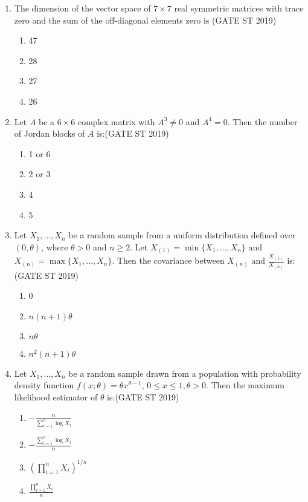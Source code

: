 \documentclass[journal]{IEEEtran}
\begin{document}
\begin{enumerate}[start=1]
\item The dimension of the vector space of \(7 \times 7\) real symmetric matrices with trace zero and the sum of the off-diagonal elements zero is \hfill(GATE ST 2019)
\begin{multicols}{4}
\begin{enumerate}
    \item 47
    \item 28
    \item 27
    \item 26
\end{enumerate}
\end{multicols}



\item Let \(A\) be a \(6 \times 6\) complex matrix with \(A^3 \neq 0\) and \(A^4 = 0\). Then the number of Jordan blocks of \(A\) is:\hfill(GATE ST 2019)
\begin{multicols}{4}
\begin{enumerate}
     \item 1 or 6
     \item 2 or 3
     \item 4
     \item 5
\end{enumerate}
\end{multicols}

\item Let \(X_1, \ldots, X_n\) be a random sample from a uniform distribution defined over \((0, \theta)\), where \(\theta > 0\) and \(n \geq 2\). Let \(X_{(1)} = \min\{X_1,\ldots,X_n\}\) and \(X_{(n)} = \max\{X_1, \ldots, X_n\}\). Then the covariance between \(X_{(n)}\) and \(\frac{X_{(1)}}{X_{(n)}}\) is:\hfill(GATE ST 2019)
\begin{multicols}{4}
\begin{enumerate}
\item 0
\item \(n(n+1) \theta\)
\item \(n \theta\)
\item \(n^2 (n+1) \theta\)
\end{enumerate}
\end{multicols}

\item Let \(X_1, \ldots, X_n\) be a random sample drawn from a population with probability density function \(f(x; \theta) = \theta x^{\theta - 1}, \, 0 \leq x \leq 1, \theta > 0\). Then the maximum likelihood estimator of \(\theta\) is:\hfill(GATE ST 2019)
\begin{multicols}{4}
\begin{enumerate}
\item \(- \frac{n}{\sum_{i=1}^n \log X_i}\)
\item \(- \frac{\sum_{i=1}^n \log X_i}{n}\)
\item \(\left(\prod_{i=1}^n X_i \right)^{1/n}\)
\item \(\frac{\prod_{i=1}^n X_i}{n}\)
\end{enumerate}
\end{multicols}


\end{enumerate}
\end{document}
